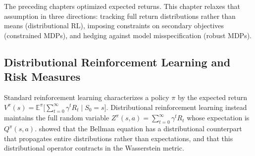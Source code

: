 
The preceding chapters optimized expected returns. This chapter relaxes
that assumption in three directions: tracking full return distributions
rather than means (distributional RL), imposing constraints on secondary
objectives (constrained MDPs), and hedging against model misspecification
(robust MDPs).



\subsection{Distributional Reinforcement Learning and Risk Measures}
\label{subsec:distributional_rl}

Standard reinforcement learning characterizes a policy $\pi$ by the
expected return $V^\pi(s) = \mathbb{E}^\pi\bigl[\sum_{t=0}^\infty \gamma^t
R_t \mid S_0 = s\bigr]$. Distributional reinforcement learning instead
maintains the full random variable $Z^\pi(s,a) = \sum_{t=0}^\infty \gamma^t
R_t$ whose expectation is $Q^\pi(s,a)$. \citet{Bellemare2017} showed that
the Bellman equation has a distributional counterpart that propagates entire
distributions rather than expectations, and that this distributional operator
contracts in the Wasserstein metric.

